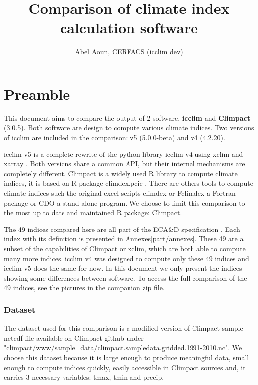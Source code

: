 \documentclass[a4paper,11pt]{article}
\title{Comparison of climate index calculation software}
\author{Abel Aoun, CERFACS (icclim dev)}
\begin{document}
\maketitle
\part*{Preamble}
    This document aims to compare the output of 2 software, \textbf{icclim} \cite{gh/icclim} and \textbf{Climpact} \cite{gh/Climpact} (3.0.5). Both software are design to compute various climate indices.
    Two versions of icclim are included in the comparison: v5 (5.0.0-beta) and v4 (4.2.20).

    icclim v5 is a complete rewrite of the python library icclim v4 using xclim \cite{gh/xclim} and xarray \cite{gh/xarray}. Both versions share a common API, but their internal mechanisms are completely different.
    Climpact is a widely used R library to compute climate indices, it is based on R package climdex.pcic \cite{gh/climdex}.
    There are others tools to compute climate indices such the original excel scripts climdex \cite{doc/climdex} or Fclimdex \cite{gh/fclimdex} a Fortran package or CDO \cite{doc/cdo_eca} a stand-alone program.
    We choose to limit this comparison to the most up to date and maintained R package: Climpact.

    The 49 indices compared here are all part of the ECA\&D specification \cite{doc/ecad_new}. Each index with its definition is presented in Annexes\ref{part/annexes}.
    These 49 are a subset of the capabilities of Climpact or xclim, which are both able to compute many more indices.
    icclim v4 was designed to compute only these 49 indices and icclim v5 does the same for now.
    In this document we only present the indices showing some differences between software.
    To access the full comparison of the 49 indices, see the pictures in the companion zip file.

    \section{Dataset}
        The dataset used for this comparison is a modified version of Climpact sample netcdf file available on Climpact github \cite{gh/Climpact} under "climpact/www/sample\_data/climpact.sampledata.gridded.1991-2010.nc".
        We choose this dataset because it is large enough to produce meaningful data, small enough to compute indices quickly, 
        easily accessible in Climpact sources and, it carries 3 necessary variables: tmax, tmin and precip.
\end{document}
